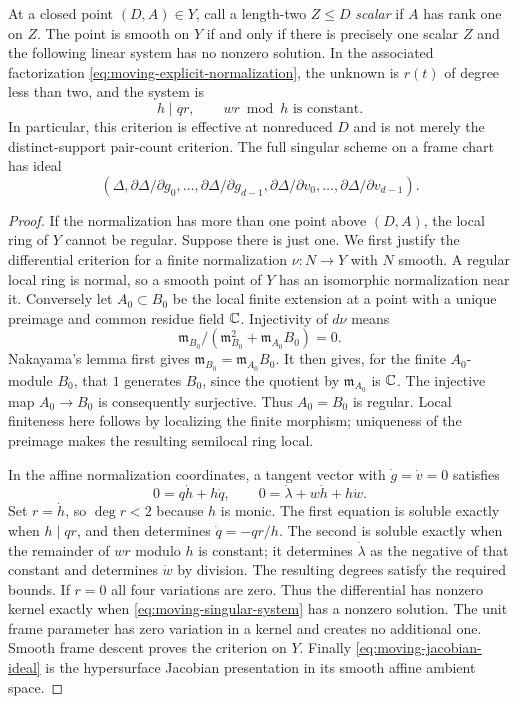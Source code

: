 \begin{proposition}
\label{prop:moving-singular-test}
At a closed point $(D,A)\in Y$, call a length-two $Z\le D$
\emph{scalar} if $A$ has rank one on $Z$. The point is smooth on
$Y$ if and only if there is precisely one scalar $Z$ and the
following linear system has no nonzero solution. In the associated
factorization \eqref{eq:moving-explicit-normalization}, the unknown
is $r(t)$ of degree less than two, and the system is
\begin{equation}\label{eq:moving-singular-system}
                 h\mid qr,\qquad wr\bmod h\text{ is constant}.
\end{equation}
In particular, this criterion is effective at nonreduced $D$ and
is not merely the distinct-support pair-count criterion. The full
singular scheme on a frame chart has ideal
\begin{equation}\label{eq:moving-jacobian-ideal}
 (\Delta,\partial\Delta/\partial g_0,\ldots,
          \partial\Delta/\partial g_{d-1},
          \partial\Delta/\partial v_0,\ldots,
          \partial\Delta/\partial v_{d-1}).
\end{equation}
\end{proposition}
\begin{proof}
If the normalization has more than one point above $(D,A)$, the
local ring of $Y$ cannot be regular. Suppose there is just one.
We first justify the differential criterion for a finite
normalization $\nu:N\to Y$ with $N$ smooth. A regular local ring
is normal, so a smooth point of $Y$ has an isomorphic normalization
near it. Conversely let $A_0\subset B_0$ be the local finite
extension at a point with a unique preimage and common residue
field $\mathbb C$. Injectivity of $d\nu$ means
\[
 \mathfrak m_{B_0}/(\mathfrak m_{B_0}^2+
                         \mathfrak m_{A_0}B_0)=0.
\]
Nakayama's lemma first gives
$\mathfrak m_{B_0}=\mathfrak m_{A_0}B_0$. It then gives, for the
finite $A_0$-module $B_0$, that $1$ generates $B_0$, since the
quotient by $\mathfrak m_{A_0}$ is $\mathbb C$. The injective map
$A_0\to B_0$ is consequently surjective. Thus $A_0=B_0$ is regular.
Local finiteness here follows by localizing the finite morphism;
uniqueness of the preimage makes the resulting semilocal ring local.

In the affine normalization coordinates, a tangent vector with
$\dot g=\dot v=0$ satisfies
\[
 0=q\dot h+h\dot q,\qquad
 0=\dot\lambda+w\dot h+h\dot w.
\]
Set $r=\dot h$, so $\deg r<2$ because $h$ is monic. The first
equation is soluble exactly when $h\mid qr$, and then determines
$\dot q=-qr/h$. The second is soluble exactly when the remainder
of $wr$ modulo $h$ is constant; it determines $\dot\lambda$ as
the negative of that constant and determines $\dot w$ by division.
The resulting degrees satisfy the required bounds. If $r=0$ all
four variations are zero. Thus the differential has nonzero kernel
exactly when \eqref{eq:moving-singular-system} has a nonzero solution.
The unit frame parameter has zero variation in a kernel and creates
no additional one. Smooth frame descent proves the criterion on
$Y$. Finally \eqref{eq:moving-jacobian-ideal} is the hypersurface
Jacobian presentation in its smooth affine ambient space.
\end{proof}


